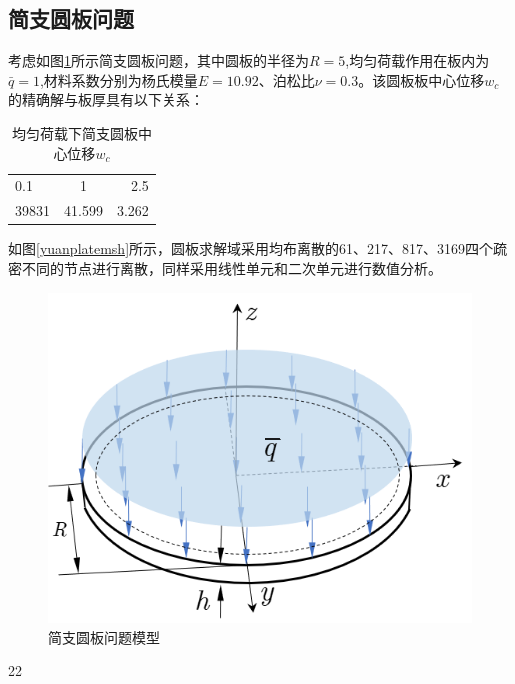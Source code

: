 \subsection{简支圆板问题}
考虑如图\ref{yuanplate}所示简支圆板问题，其中圆板的半径为$R=5$,均匀荷载作用在板内为$\bar{q}=1$,材料系数分别为杨氏模量$E=10.92$、泊松比$\nu=0.3$。该圆板板中心位移$w_c$的精确解与板厚具有以下关系：

\begin{table} 
    \centering
    \caption{均匀荷载下简支圆板中心位移$w_c$}
    \begin{tabular}{l|c|r}
        \hline
        0.1   &1      & 2.5   \\
        39831 &41.599 & 3.262 \\
        \hline
    \end{tabular}
\end{table}
如图\ref{yuanplatemsh}所示，圆板求解域采用均布离散的61、217、817、3169四个疏密不同的节点进行离散，同样采用线性单元和二次单元进行数值分析。
\begin{figure}[H]
    \centering 
        \includegraphics[scale=0.8]{figures/shearlocking/yuan plate.png}
        \caption{简支圆板问题模型}\label{yuanplate}
\end{figure}22
